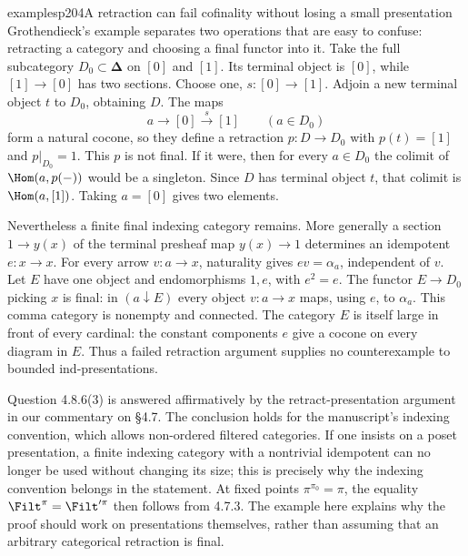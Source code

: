 \begin{dcomment}{examples}{p204}{A retraction can fail cofinality without losing a small presentation}
Grothendieck's example separates two operations that are easy to confuse: retracting a category and choosing a final functor into it. Take the full subcategory $D_0\subset\boldsymbol\Delta$ on $[0]$ and $[1]$. Its terminal object is $[0]$, while $[1]\to[0]$ has two sections. Choose one, $s:[0]\to[1]$. Adjoin a new terminal object $t$ to $D_0$, obtaining $D$. The maps
\[
 a\longrightarrow[0]\xrightarrow{s}[1]
 \qquad(a\in D_0)
\]
form a natural cocone, so they define a retraction $p:D\to D_0$ with $p(t)=[1]$ and $p|_{D_0}=1$. This $p$ is not final. If it were, then for every $a\in D_0$ the colimit of $\Hom(a,p(-))$ would be a singleton. Since $D$ has terminal object $t$, that colimit is $\Hom(a,[1])$. Taking $a=[0]$ gives two elements.

Nevertheless a finite final indexing category remains. More generally a section $1\to y(x)$ of the terminal presheaf map $y(x)\to1$ determines an idempotent $e:x\to x$. For every arrow $v:a\to x$, naturality gives $ev=\alpha_a$, independent of $v$. Let $E$ have one object and endomorphisms $1,e$, with $e^2=e$. The functor $E\to D_0$ picking $x$ is final: in $(a\downarrow E)$ every object $v:a\to x$ maps, using $e$, to $\alpha_a$. This comma category is nonempty and connected. The category $E$ is itself large in front of every cardinal: the constant components $e$ give a cocone on every diagram in $E$. Thus a failed retraction argument supplies no counterexample to bounded ind-presentations.

Question 4.8.6(3) is answered affirmatively by the retract-presentation argument in our commentary on \S4.7. The conclusion holds for the manuscript's indexing convention, which allows non-ordered filtered categories. If one insists on a poset presentation, a finite indexing category with a nontrivial idempotent can no longer be used without changing its size; this is precisely why the indexing convention belongs in the statement. At fixed points $\pi^{\pi_0}=\pi$, the equality $\Filt^\pi=\Filt'^\pi$ then follows from 4.7.3. The example here explains why the proof should work on presentations themselves, rather than assuming that an arbitrary categorical retraction is final.
\end{dcomment}

